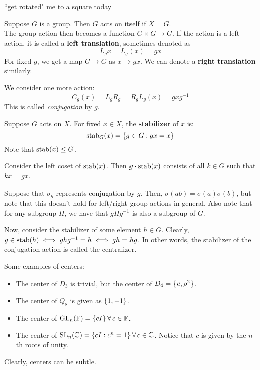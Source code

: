 \newpage
{}

``get rotated" me to a square today

\begin{crll}
    Suppose $ G $ is a group.
    Then $ G $ acts on itself if $ X = G $. \\
    The group action then becomes a function $ G \times G \rightarrow G $. \vsp
    If the action is a left action, it is called a \textbf{left translation}, sometimes denoted as
    \begin{equation*}
        L_{g}x = L_{g}(x) = gx
    \end{equation*}
    For fixed $ g $, we get a map $ G \rightarrow G $ as $ x \rightarrow gx $.
    We can denote a \textbf{right translation} similarly.
\end{crll}

We consider one more action:
\begin{equation*}
    C_{g}(x) = L_{g}R_{g} = R_{g}L_{g}(x) = gxg^{-1}
\end{equation*}
This is called \textit{conjugation} by $ g $.

\begin{defn}
    Suppose $ G $ acts on $ X $.
    For fixed $ x \in X $, the \textbf{stabilizer} of $ x $ is:
    \begin{equation*}
        \operatorname{stab}_{G}(x) = \left\{{g \in G : gx = x}\right\}
    \end{equation*}
    Note that $ \operatorname{stab} (x) \leq G $.
\end{defn}

Consider the left coset of $ \operatorname{stab}(x) $.
Then $ g\cdot\operatorname{stab} (x) $ consists of all $ k \in G $ such that $ kx = gx $.


Suppose that $ \sigma_{g} $ represents conjugation by $ g $.
Then, $ \sigma(ab) = \sigma(a)\sigma(b) $, but note that this doesn't hold for
left/right group actions in general.
Also note that for any subgroup $ H $, we have that $ gHg^{-1} $ is also a subgroup of $ G $.

Now, consider the stabilizer of some element $ h \in G $.
Clearly, $ g \in \operatorname{stab}(h) \iff ghg^{-1} = h \iff gh = hg $.
In other words, the stabilizer of the conjugation action is called the centralizer.

Some examples of centers:
\begin{itemize}
    \item The center of $ D_{3} $ is trivial, but the center of $ D_{4} = \left\{{e, \rho^{2}}\right\} $.
    \item The center of $ Q_{8} $ is given as $ \left\{{1, -1}\right\} $.
    \item The center of $ \operatorname{GL}_{n}(\mathbb{F}) = \left\{{cI}\right\} \forall \,  c \in \mathbb{F} $.
    \item The center of $ \operatorname{SL}_{n}(\mathbb{C}) = \left\{{cI : c^{n} = 1}\right\} \forall \, c \in \mathbb{C} $.
        Notice that $ c $ is given by the $ n $-th roots of unity.
\end{itemize}
Clearly, centers can be subtle.

